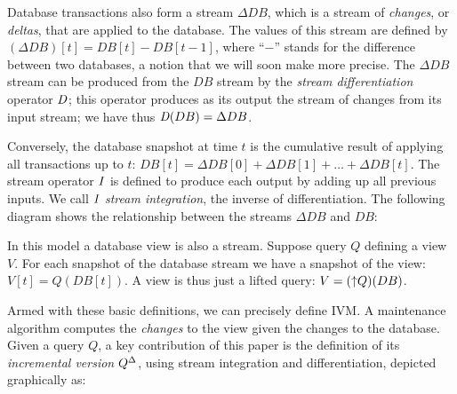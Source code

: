 Database transactions also form a stream $\Delta DB$, which is a
stream of \emph{changes}, or \emph{deltas}, that are applied to the
database.  The values of this stream are defined by $(\Delta DB)[t] =
DB[t] - DB[t-1]$, where ``$-$'' stands for the difference between two
databases, a notion that we will soon make more precise.  The $\Delta
DB$ stream can be produced from the $DB$ stream by the \emph{stream
differentiation} operator $\mathit{D}$; this operator produces as its output
the stream of changes from its input stream; we have thus $\mathit{D}(DB) =
\Delta DB$.

Conversely, the database snapshot at time $t$ is the cumulative result
of applying all transactions up to $t$: $DB[t] = \Delta DB[0] + \Delta
DB[1] + \ldots + \Delta DB[t]$.  The stream operator $\mathit{I}$ is defined
to produce each output by adding up all previous inputs.  We call $\mathit{I}$
\emph{stream integration}, the inverse of differentiation.  The
following diagram shows the relationship between the streams $\Delta
DB$ and $DB$:
\begin{center}
\end{center}

In this model a database view is also a stream.  Suppose query $Q$
defining a view $V$.  For each snapshot of the database stream we have
a snapshot of the view: $V[t] = Q(DB[t])$.  A view is thus just a
lifted query: $V = ({\uparrow}Q)(DB)$.

Armed with these basic definitions, we can precisely define IVM.  A
maintenance algorithm computes the \emph{changes} to the view given
the changes to the database. Given a query $Q$, a key contribution of
this paper is the definition of its \emph{incremental version}
${Q}^{\Delta}$, using stream integration and differentiation, depicted
graphically as:

%
\begin{center}
\end{center}

